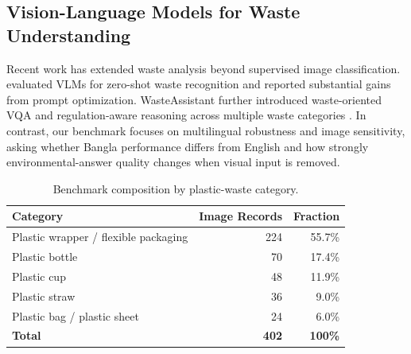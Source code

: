 \documentclass{article}
\begin{document}
\subsection{Vision-Language Models for Waste Understanding}

Recent work has extended waste analysis beyond supervised image classification. \citet{malla2025wasterecognition} evaluated VLMs for zero-shot waste recognition and reported substantial gains from prompt optimization. WasteAssistant further introduced waste-oriented VQA and regulation-aware reasoning across multiple waste categories \citep{kataruka2026wasteassistant}. In contrast, our benchmark focuses on multilingual robustness and image sensitivity, asking whether Bangla performance differs from English and how strongly environmental-answer quality changes when visual input is removed.
\begin{table}[t] \centering \caption{Benchmark composition by plastic-waste category.} \label{tab:benchmark_composition} \begin{tabular}{lrr} \toprule \textbf{Category} & \textbf{Image Records} & \textbf{Fraction} \\ \midrule Plastic wrapper / flexible packaging & 224 & 55.7\% \\ Plastic bottle & 70 & 17.4\% \\ Plastic cup & 48 & 11.9\% \\ Plastic straw & 36 & 9.0\% \\ Plastic bag / plastic sheet & 24 & 6.0\% \\ \midrule \textbf{Total} & \textbf{402} & \textbf{100\%} \\ \bottomrule \end{tabular} \end{table}
\end{document}
